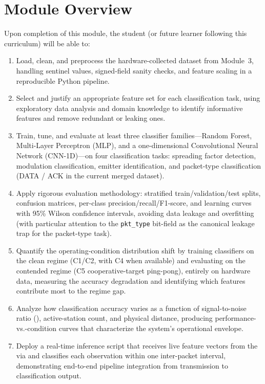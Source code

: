 \documentclass[11pt,letterpaper]{article}
\begin{document}
	\tableofcontents
	\newpage

	\section{Module Overview}

	\begin{tcolorbox}[objective={Module 4 Learning Objectives}]
		Upon completion of this module, the student (or future learner following this curriculum) will be able to:
		\begin{enumerate}[label=\textbf{LO-\arabic*}]
			\item Load, clean, and preprocess the hardware-collected \RF{} dataset from Module~3, handling sentinel values, signed-field sanity checks, and feature scaling in a reproducible Python pipeline.
			\item Select and justify an appropriate feature set for each classification task, using exploratory data analysis and domain knowledge to identify informative features and remove redundant or leaking ones.
			\item Train, tune, and evaluate at least three classifier families---Random Forest, Multi-Layer Perceptron (MLP), and a one-dimensional Convolutional Neural Network (CNN-1D)---on four classification tasks: spreading factor detection, modulation classification, emitter identification, and packet-type classification (DATA / ACK in the current merged dataset).
			\item Apply rigorous evaluation methodology: stratified train/validation/test splits, confusion matrices, per-class precision/recall/F1-score, and learning curves with 95\% Wilson confidence intervals, avoiding data leakage and overfitting (with particular attention to the \texttt{pkt\_type} bit-field as the canonical leakage trap for the packet-type task).
			\item Quantify the operating-condition distribution shift by training classifiers on the clean regime (C1/C2, with C4 when available) and evaluating on the contended regime (C5 cooperative-target ping-pong), entirely on hardware data, measuring the accuracy degradation and identifying which features contribute most to the regime gap.
			\item Analyze how classification accuracy varies as a function of signal-to-noise ratio (\SNR{}), active-station count, and physical distance, producing performance-vs.-condition curves that characterize the system's operational envelope.
			\item Deploy a real-time inference script that receives live feature vectors from the \FPGA{} via \UART{} and classifies each observation within one inter-packet interval, demonstrating end-to-end pipeline integration from \RF{} transmission to classification output.
		\end{enumerate}
	\end{tcolorbox}
\end{document}

